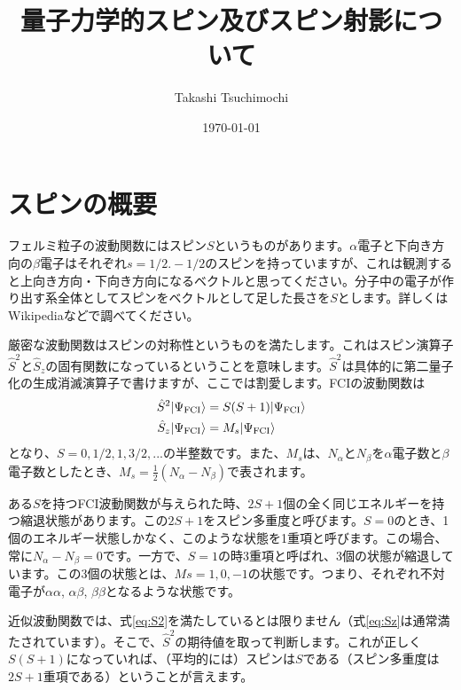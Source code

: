 \documentclass[prb,amsmath,amsfonts,amssymb]{revtex4}
\begin{document}
\title{量子力学的スピン及びスピン射影について}
\author{Takashi Tsuchimochi}
\date{\today}
\maketitle

\section{スピンの概要}
フェルミ粒子の波動関数にはスピン$S$というものがあります。$\alpha$電子と下向き方向の$\beta$電子はそれぞれ$s=1/2. -1/2$のスピンを持っていますが、これは観測すると上向き方向・下向き方向になるベクトルと思ってください。分子中の電子が作り出す系全体としてスピンをベクトルとして足した長さを$S$とします。詳しくはWikipediaなどで調べてください。

厳密な波動関数はスピンの対称性というものを満たします。これはスピン演算子$\hat S^2$と$\hat S_z$の固有関数になっているということを意味します。$\hat S^2$は具体的に第二量子化の生成消滅演算子で書けますが、ここでは割愛します。FCIの波動関数は
\begin{align}
\hat S^2 |\Psi_{\rm FCI}\rangle &= S(S+1)|\Psi_{\rm FCI}\rangle \label{eq:S2}\\
\hat S_z |\Psi_{\rm FCI}\rangle &= M_s|\Psi_{\rm FCI}\rangle	 \label{eq:Sz}
\end{align}
となり、$S=0,1/2,1,3/2,...$の半整数です。また、$M_s$は、$N_\alpha$と$N_\beta$を$\alpha$電子数と$\beta$電子数としたとき、$M_s = \frac{1}{2}(N_\alpha-N_\beta)$で表されます。

ある$S$を持つFCI波動関数が与えられた時、$2S+1$個の全く同じエネルギーを持つ縮退状態があります。この$2S+1$をスピン多重度と呼びます。$S=0$のとき、1個のエネルギー状態しかなく、このような状態を1重項と呼びます。この場合、常に$N_\alpha-N_\beta = 0$です。一方で、$S=1$の時3重項と呼ばれ、3個の状態が縮退しています。この3個の状態とは、$Ms =1, 0, -1$の状態です。つまり、それぞれ不対電子が$\alpha\alpha$, $\alpha\beta$, $\beta\beta$となるような状態です。

近似波動関数では、式\ref{eq:S2}を満たしているとは限りません（式\ref{eq:Sz}は通常満たされています）。そこで、$\hat S^2$の期待値を取って判断します。これが正しく$S(S+1)$になっていれば、（平均的には）スピンは$S$である（スピン多重度は$2S+1$重項である）ということが言えます。
\end{document}

